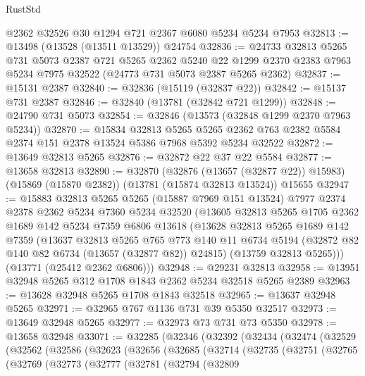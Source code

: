 \begin{lexlean}{RustStd}
\begin{coremodule}
    @2362
    @32526
    @30
    @1294
    @721
    @2367
    @6080
    @5234
    @5234
    @7953
@32813 := @13498 (@13528 (@13511 @13529)) @24754
@32836 := @24733
    @32813
    @5265
    @731
    @5073
    @2387
    @721
    @5265
    @2362
    @5240
    @22
    @1299
    @2370
    @2383
    @7963
    @5234
    @7975
    @32522
    (@24773 @731 @5073 @2387 @5265 @2362)
@32837 := @15131 @2387
@32840 := @32836 (@15119 (@32837 @22))
@32842 := @15137 @731 @2387
@32846 := @32840 (@13781 (@32842 @721 @1299))
@32848 := @24790 @731 @5073
@32854 := @32846 (@13573 (@32848 @1299 @2370 @7963 @5234))
@32870 := @15834
    @32813
    @5265
    @5265
    @2362
    @763
    @2382
    @5584
    @2374
    @151
    @2378
    @13524
    @5386
    @7968
    @5392
    @5234
    @32522
@32872 := @13649 @32813 @5265
@32876 := @32872 @22 @37 @22 @5584
@32877 := @13658 @32813
@32890 := @32870
    (@32876 (@13657 (@32877 @22)) @15983)
    (@15869 (@15870 @2382))
    (@13781 (@15874 @32813 @13524))
    @15655
@32947 := @15883
    @32813
    @5265
    @5265
    (@15887 @7969 @151 @13524)
    @7977
    @2374
    @2378
    @2362
    @5234
    @7360
    @5234
    @32520
    (@13605
      @32813
      @5265
      @1705
      @2362
      @1689
      @142
      @5234
      @7359
      @6806
      @13618
      (@13628
        @32813
        @5265
        @1689
        @142
        @7359
        (@13637
          @32813
          @5265
          @765
          @773
          @140
          @11
          @6734
          @5194
          (@32872 @82 @140 @82 @6734 (@13657 (@32877 @82)) @24815)
          (@13759 @32813 @5265)))
      (@13771 (@25412 @2362 @6806)))
@32948 := @29231 @32813
@32958 := @13951 @32948 @5265 @312 @1708 @1843 @2362 @5234 @32518 @5265 @2389
@32963 := @13628 @32948 @5265 @1708 @1843 @32518
@32965 := @13637 @32948 @5265
@32971 := @32965 @767 @1136 @731 @39 @5350 @32517
@32973 := @13649 @32948 @5265
@32977 := @32973 @73 @731 @73 @5350
@32978 := @13658 @32948
@33071 := @32285
    (@32346
      (@32392
        (@32434
          (@32474
            (@32529
              (@32562
                (@32586
                  (@32623
                    (@32656
                      (@32685
                        (@32714
                          (@32735
                            (@32751
                              (@32765
                                (@32769
                                  (@32773
                                    (@32777
                                      (@32781
                                        (@32794
                                          (@32809

\end{coremodule}
\end{lexlean}
